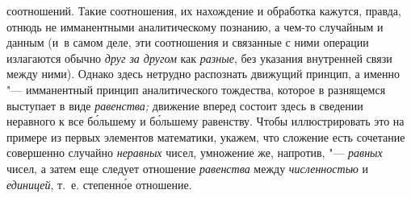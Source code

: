 соотношений. Такие соотношения, их нахождение и обработка кажутся, правда,
отнюдь не имманентными аналитическому познанию, а чем-то
случайным и данным (и~в самом деле, эти соотношения и связанные с ними
операции излагаются обычно {\em друг за другом} как {\em разные}, без
указания внутренней связи между ними). Однако здесь нетрудно распознать
движущий принцип, а именно "--- имманентный принцип
аналитического тождества, которое в разнящемся выступает в виде
{\em равенства;} движение
вперед состоит здесь в сведении неравного к все б\'{о}льшему и б\'{о}льшему
равенству. Чтобы иллюстрировать это на примере из первых элементов
математики, укажем, что сложение есть сочетание совершенно случайно
{\em неравных} чисел, умножение же, напротив, "--- {\em равных}
чисел, а затем еще следует отношение {\em равенства} между {\em численностью}
и {\em единицей}, т.~е. степенн\'{о}е отношение.

